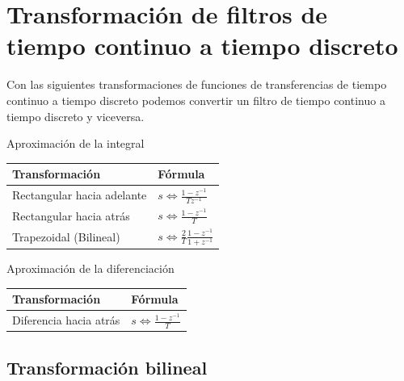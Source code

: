 \section{Transformaci\'{o}n de filtros de tiempo continuo a tiempo discreto}

Con las siguientes transformaciones de funciones de transferencias de tiempo continuo a tiempo discreto podemos convertir un filtro de tiempo continuo a tiempo discreto y viceversa.

\begin{center}
	Aproximaci\'{o}n de la integral \\ \vspace{0.2cm}
	\renewcommand{\arraystretch}{1.8}
	\begin{tabular}{ll}
		\textbf{Transformaci\'{o}n} & \textbf{F\'{o}rmula} \\ \hline
		Rectangular hacia adelante & $s \Leftrightarrow \frac{1-z^{-1}}{Tz^{-1}}$ \label{adelante} \\
		Rectangular hacia atr\'{a}s & $s \Leftrightarrow \frac{1-z^{-1}}{T}$ \label{atras}\\
		Trapezoidal (Bilineal) & $s \Leftrightarrow \frac{2}{T}\frac{1-z^{-1}}{1+z^{-1}}$ \label{trapezoidal}
	\end{tabular}
\end{center}

\vspace{0.5cm}

\begin{center}
	Aproximaci\'{o}n de la diferenciaci\'{o}n \\ \vspace{0.2cm}
	\renewcommand{\arraystretch}{1.8}
	\begin{tabular}{ll}
		\textbf{Transformaci\'{o}n} & \textbf{F\'{o}rmula} \\ \hline
		Diferencia hacia atr\'{a}s & $s \Leftrightarrow \frac{1-z^{-1}}{T}$
	\end{tabular}
\end{center}

\subsection{Transformaci\'{o}n bilineal}

